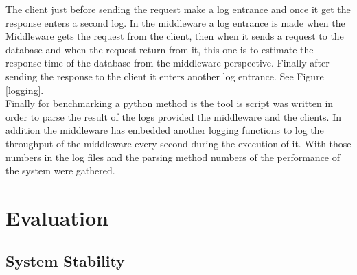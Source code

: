 The client just before sending the request make a log entrance and once it get the response enters a second log. In the middleware a log entrance is made when the Middleware gets the request from the client, then when it sends a request to the database and when the request return from it, this one is to estimate the response time of the database from the middleware perspective. Finally after sending the response to the client it enters another log entrance. See Figure \ref{logging}.\\

Finally for benchmarking a python method is the tool is script was written in order to parse the result of the logs provided the middleware and the clients. In addition the middleware has embedded another logging functions to log the throughput of the middleware every second during the execution of it. With those numbers in the log files and the parsing method numbers of the performance of the system were gathered.

\section{Evaluation}\label{sec:evaluation}


\subsection{System Stability}\label{sec:system-stability}

